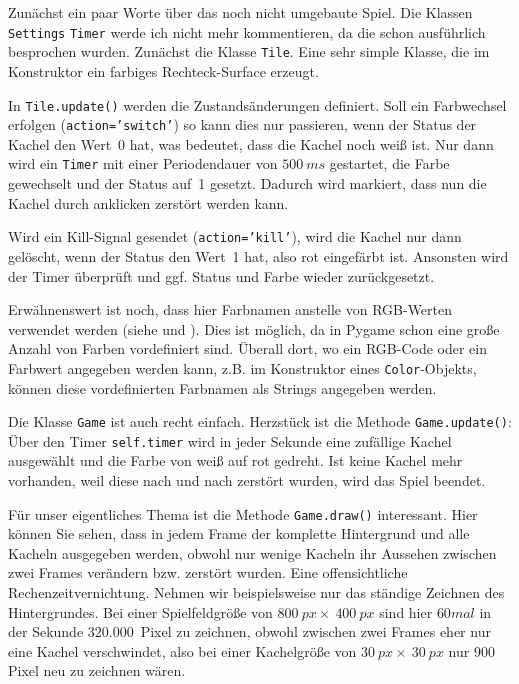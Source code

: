 Zunächst ein paar Worte über das noch nicht umgebaute Spiel. Die Klassen \texttt{Settings} \texttt{Timer} werde ich nicht mehr kommentieren, da die schon ausführlich besprochen wurden. Zunächst die Klasse \texttt{Tile}. Eine sehr simple Klasse, die im Konstruktor ein farbiges Rechteck-Surface erzeugt. 

In \texttt{Tile.update()} werden die Zustandsänderungen definiert. Soll ein Farbwechsel erfolgen (\texttt{action='switch'}) so kann dies nur passieren, wenn der Status der Kachel den Wert~0 hat, was bedeutet, dass die Kachel noch weiß ist. Nur dann wird ein \texttt{Timer} mit einer Periodendauer von $500~ms$ gestartet, die Farbe gewechselt und der Status auf~1 gesetzt. Dadurch wird markiert, dass nun die Kachel durch anklicken zerstört werden kann.

Wird ein Kill-Signal gesendet (\texttt{action='kill'}), wird die Kachel nur dann gelöscht, wenn der Status den Wert~1 hat, also rot eingefärbt ist. Ansonsten wird der Timer überprüft und ggf. Status und Farbe wieder zurückgesetzt.

Erwähnenswert ist noch, dass hier Farbnamen anstelle von RGB-Werten verwendet werden (siehe  und ). Dies ist möglich, da in Pygame schon eine große Anzahl von Farben vordefiniert sind. Überall dort, wo ein RGB-Code oder ein Farbwert angegeben werden kann, z.B. im Konstruktor eines \texttt{Color}-Objekts, können diese vordefinierten Farbnamen als Strings angegeben werden.


Die Klasse \texttt{Game} ist auch recht einfach. Herzstück ist die Methode \texttt{Game.update()}: Über den Timer \texttt{self.timer} wird in jeder Sekunde eine zufällige Kachel ausgewählt und die Farbe von weiß auf rot gedreht. Ist keine Kachel mehr vorhanden, weil diese nach und nach zerstört wurden, wird das Spiel beendet.

Für unser eigentliches Thema ist die Methode \texttt{Game.draw()} interessant. Hier können Sie sehen, dass in jedem Frame der komplette Hintergrund und alle Kacheln ausgegeben werden, obwohl nur wenige Kacheln ihr Aussehen zwischen zwei Frames verändern bzw. zerstört wurden. Eine offensichtliche Rechenzeitvernichtung. Nehmen wir beispielsweise nur das ständige Zeichnen des Hintergrundes. Bei einer Spielfeldgröße von $800~px\times~400~px$ sind hier $60mal$ in der Sekunde $320.000$~Pixel zu zeichnen, obwohl zwischen zwei Frames eher nur eine Kachel verschwindet, also bei einer Kachelgröße von $30~px\times~30~px$ nur $900$ Pixel neu zu zeichnen wären.

